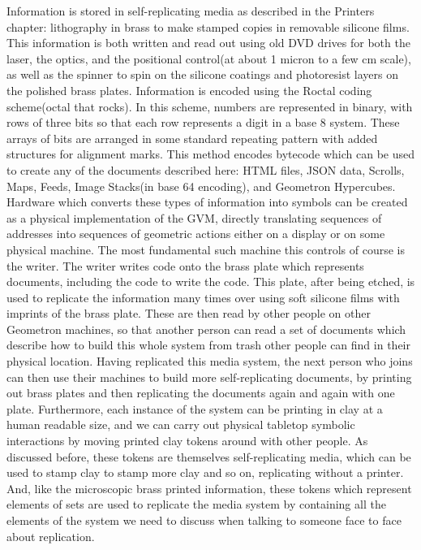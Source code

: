 Information is stored in self-replicating media as described in the Printers chapter: lithography in brass to make stamped copies in removable silicone films.  This information is both written and read out using old DVD drives for both the laser, the optics, and the positional control(at about 1 micron to a few cm scale), as well as the spinner to spin on the silicone coatings and photoresist layers on the polished brass plates.  Information is encoded using the Roctal coding scheme(octal that rocks).  In this scheme, numbers are represented in binary, with rows of three bits so that each row represents a digit in a base 8 system.  These arrays of bits are arranged in some standard repeating pattern with added structures for alignment marks.  This method encodes bytecode which can be used to create any of the documents described here: HTML files, JSON data, Scrolls, Maps, Feeds, Image Stacks(in base 64 encoding), and Geometron Hypercubes.  Hardware which converts these types of information into symbols can be created as a physical implementation of the GVM, directly translating sequences of addresses into sequences of geometric actions either on a display or on some physical machine.  The most fundamental such machine this controls of course is the writer.  The writer writes code onto the brass plate which represents documents, including the code to write the code.  This plate, after being etched, is used to replicate the information many times over using soft silicone films with imprints of the brass plate.  These are then read by other people on other Geometron machines, so that another person can read a set of documents which describe how to build this whole system from trash other people can find in their physical location.  Having replicated this media system, the next person who joins can then use their machines to build more self-replicating documents, by printing out brass plates and then replicating the documents again and again with one plate.  Furthermore, each instance of the system can be printing in clay at a human readable size, and we can carry out physical tabletop symbolic interactions by moving printed clay tokens around with other people.  As discussed before, these tokens are themselves self-replicating media, which can be used to stamp clay to stamp more clay and so on, replicating without a printer.  And, like the microscopic brass printed information, these tokens which represent elements of sets are used to replicate the media system by containing all the elements of the system we need to discuss when talking to someone face to face about replication.

